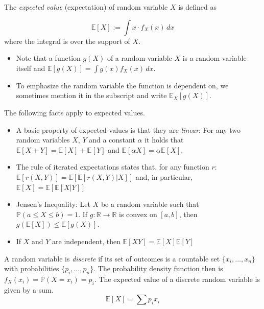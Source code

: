 \documentclass[
    a4paper, %
	fontsize=10pt, %
	twoside=false, %
]{kaobook}
\begin{document}
\begin{definition}
  The \textit{expected value} (expectation) of random variable \(X\) is
  defined as
  
  \[ \mathbb{E}[X] := \int x \cdot
    f_X(x) \, dx
  \]
  where the integral is over the support of $X$. 
\end{definition}

\begin{itemize}
	\item Note that a function \(g(X)\) of a random variable \(X\) is a random variable itself and $\mathbb{E}[g(X)] = {\int g(x)f_X(x) \, dx}$. %
	\item To emphasize the random
  variable the function is dependent on, we sometimes mention it in the
  subscript and write $\mathbb{E}_X[g(X)]$.
\end{itemize}


\begin{lemma}
  \label{thm:expected-value-properties}
The following facts apply to expected values.
\begin{itemize}
	\item A basic property of expected values is that they are \textit{linear}: For any two random variables $X$, $Y$ and a constant $\alpha$ it holds that $\mathbb{E}\left[ X + Y \right] = \mathbb{E}\left[ X \right] + \mathbb{E}_{}\left[ Y \right]$ and $\mathbb{E}_{}\left[ \alpha X \right] = \alpha \mathbb{E}_{}\left[ X \right]$.
  \item The rule of iterated expectations states that, for any function \(r\):
    \(\mathbb{E}[r(X,Y)] = \mathbb{E}\left[\mathbb{E}[r(X,Y) | X]\right]\) and,
    in particular, \(\mathbb{E}[X] = \mathbb{E}[\mathbb{E}[X|Y]]\)
  \item Jensen's Inequality: Let $X$ be a random variable such that
    $\mathbb{P}(a \leq X \leq b)=1$. If $g: \mathbb{R} \to
    \mathbb{R}$ is convex on $[a, b]$, then
    $
    g(\mathbb{E}\left[ X \right]) \leq \mathbb{E}\left[ g(X) \right]
    $.
  \item If \(X\) and \(Y\) are independent, then \(\mathbb{E}\left[XY\right] =
    \mathbb{E}\left[X\right] \mathbb{E}\left[Y\right]\)
\end{itemize}
\end{lemma}


A random variable is \textit{discrete} if its set of outcomes is a countable set $\{ x_{i}, \dots, x_{n} \}$ with probabilities $\{ p_{i}, \dots, p_{n} \}$. The probability density function then is $f_X(x_i) = \mathbb{P}(X = x_i) = p_i$. The expected value of a discrete random variable is given by a sum.
$$
\mathbb{E}_{}\left[ X \right]  = \sum p_{i} x_{i}
$$
\end{document}
